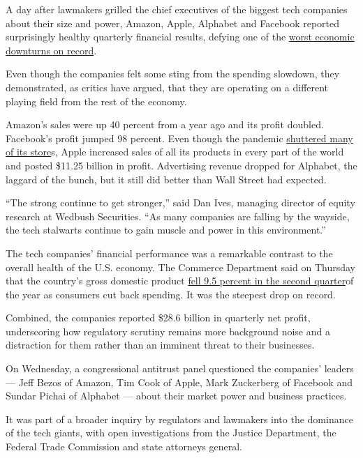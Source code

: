A day after lawmakers grilled the chief executives of the biggest tech
companies about their size and power, Amazon, Apple, Alphabet and
Facebook reported surprisingly healthy quarterly financial results,
defying one of the
\href{https://www.nytimes.com/live/2020/07/30/business/stock-market-today-coronavirus/the-us-economys-contraction-in-the-second-quarter-was-the-worst-on-record}{worst
economic downturns on record}.

Even though the companies felt some sting from the spending slowdown,
they demonstrated, as critics have argued, that they are operating on a
different playing field from the rest of the economy.

Amazon's sales were up 40 percent from a year ago and its profit
doubled. Facebook's profit jumped 98 percent. Even though the pandemic
\href{https://www.nytimes.com/2020/03/14/technology/apple-stores-coronavirus.html}{shuttered
many of its store}s, Apple increased sales of all its products in every
part of the world and posted \$11.25 billion in profit. Advertising
revenue dropped for Alphabet, the laggard of the bunch, but it still did
better than Wall Street had expected.

``The strong continue to get stronger,'' said Dan Ives, managing
director of equity research at Wedbush Securities. ``As many companies
are falling by the wayside, the tech stalwarts continue to gain muscle
and power in this environment.''

The tech companies' financial performance was a remarkable contrast to
the overall health of the U.S. economy. The Commerce Department said on
Thursday that the country's gross domestic product
\href{https://www.nytimes.com/2020/07/30/business/economy/q2-gdp-coronavirus-economy.html?action=click\&module=Top\%20Stories\&pgtype=Homepage}{fell
9.5 percent in the second quarter}of the year as consumers cut back
spending. It was the steepest drop on record.

Combined, the companies reported \$28.6 billion in quarterly net profit,
underscoring how regulatory scrutiny remains more background noise and a
distraction for them rather than an imminent threat to their businesses.

On Wednesday, a congressional antitrust panel questioned the companies'
leaders --- Jeff Bezos of Amazon, Tim Cook of Apple, Mark Zuckerberg of
Facebook and Sundar Pichai of Alphabet --- about their market power and
business practices.

It was part of a broader inquiry by regulators and lawmakers into the
dominance of the tech giants, with open investigations from the Justice
Department, the Federal Trade Commission and state attorneys general.

